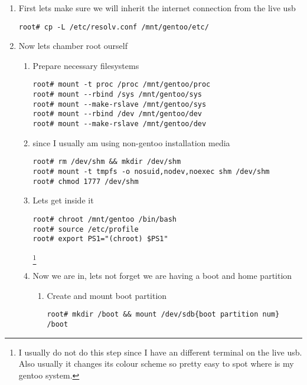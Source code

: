 \documentclass[10pt,a4paper]{article}
\begin{document}
\begin{enumerate}
\begin{enumerate}[label*=\arabic*.]
			\item First lets make sure we will inherit the internet connection from the live usb
			\begin{lstlisting}[style=BashInputRoot]
root# cp -L /etc/resolv.conf /mnt/gentoo/etc/
			\end{lstlisting}
			
			\item Now lets chamber root ourself \begin{enumerate}[label*=\arabic*.]
				\item Prepare necessary filesystems
				
				\begin{lstlisting}[style=BashInputRoot]
root# mount -t proc /proc /mnt/gentoo/proc 
root# mount --rbind /sys /mnt/gentoo/sys
root# mount --make-rslave /mnt/gentoo/sys 
root# mount --rbind /dev /mnt/gentoo/dev
root# mount --make-rslave /mnt/gentoo/dev 
				\end{lstlisting}
			
				\item since I usually am using non-gentoo installation media
				\begin{lstlisting}[style=BashInputRoot]
root# rm /dev/shm && mkdir /dev/shm 
root# mount -t tmpfs -o nosuid,nodev,noexec shm /dev/shm
root# chmod 1777 /dev/shm
				\end{lstlisting}
				
				\item Lets get inside it
				\begin{lstlisting}[style=BashInputRoot]
root# chroot /mnt/gentoo /bin/bash 
root# source /etc/profile 
root# export PS1="(chroot) $PS1"
				\end{lstlisting}\footnote{I usually do not do this step since I have an different terminal on the live usb. Also usually it changes its colour scheme so pretty easy to spot where is my gentoo system.}
			
			\item Now we are in, lets not forget we are having a boot and home partition \begin{enumerate}[label*=\arabic*.]

					\item Create and mount boot partition

					\begin{lstlisting}[style=BashInputRoot]
root# mkdir /boot && mount /dev/sdb{boot partition num} /boot
					\end{lstlisting}
					

\end{enumerate}
\end{enumerate}
\end{enumerate}
\end{enumerate}
\end{document}
